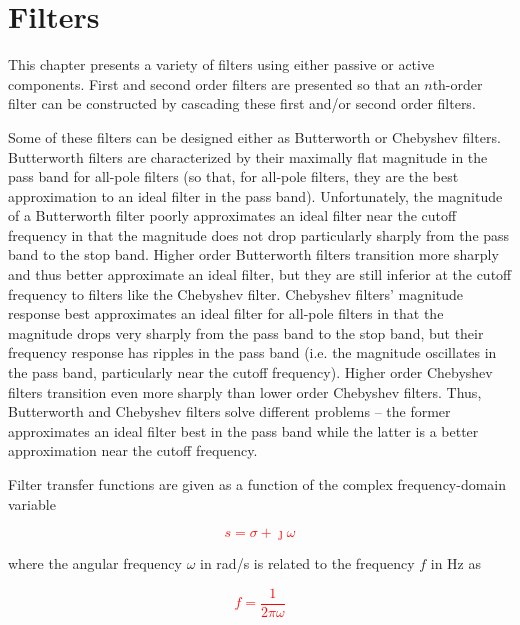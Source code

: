 \chapter{Filters}
This chapter presents a variety of filters using either passive or active components.
First and second order filters are presented so that an $n$th-order filter can be constructed by cascading these first and/or second order filters.

Some of these filters can be designed either as Butterworth or Chebyshev filters.
Butterworth filters are characterized by their maximally flat magnitude in the pass band for all-pole filters (so that, for all-pole filters, they are the best approximation to an ideal filter in the pass band).
Unfortunately, the magnitude of a Butterworth filter poorly approximates an ideal filter near the cutoff frequency in that the magnitude does not drop particularly sharply from the pass band to the stop band.
Higher order Butterworth filters transition more sharply and thus better approximate an ideal filter, but they are still inferior at the cutoff frequency to filters like the Chebyshev filter.
Chebyshev filters' magnitude response best approximates an ideal filter for all-pole filters in that the magnitude drops very sharply from the pass band to the stop band, but their frequency response has ripples in the pass band (i.e. the magnitude oscillates in the pass band, particularly near the cutoff frequency).
Higher order Chebyshev filters transition even more sharply than lower order Chebyshev filters.
Thus, Butterworth and Chebyshev filters solve different problems -- the former approximates an ideal filter best in the pass band while the latter is a better approximation near the cutoff frequency. \autocite[107, 111]{op-amp-circuits-johnson}

Filter transfer functions are given as a function of the complex frequency-domain variable

\textcolor{red}{
\begin{equation}
	s = \sigma + \jmath\omega
\end{equation}
}

where the angular frequency \(\omega\) in \si{\radian/\second} is related to the frequency \(f\) in \si{\Hz} as

\textcolor{red}{
\begin{equation}
	f = \frac{1}{2\pi\omega}
	\label{eq:omega_to_f}
\end{equation}
}


